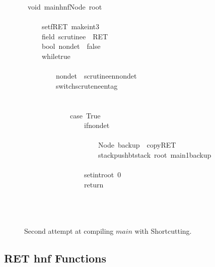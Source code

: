 \documentclass{book}
\theoremstyle{definition}
\newcommand{\Varid}[1]{\mathit{#1}}
\begin{document}
\begin{figure}
\begin{tabbing}\ttfamily
~void~mainhnfNode~root\\
\ttfamily ~\\
\ttfamily ~~~~~setfRET~makeint3\\
\ttfamily ~~~~~field~scrutinee~~RET\\
\ttfamily ~~~~~bool~nondet~~false\\
\ttfamily ~~~~~whiletrue\\
\ttfamily ~~~~~\\
\ttfamily ~~~~~~~~~nondet~~scrutineennondet\\
\ttfamily ~~~~~~~~~switchscruteneentag\\
\ttfamily ~~~~~~~~~\\
\ttfamily ~~~~~~~~~~~~~\\
\ttfamily ~~~~~~~~~~~~~case~True\\
\ttfamily ~~~~~~~~~~~~~~~~~ifnondet\\
\ttfamily ~~~~~~~~~~~~~~~~~\\
\ttfamily ~~~~~~~~~~~~~~~~~~~~~Node~backup~~copyRET\\
\ttfamily ~~~~~~~~~~~~~~~~~~~~~stackpushbtstack~root~main1backup\\
\ttfamily ~~~~~~~~~~~~~~~~~\\
\ttfamily ~~~~~~~~~~~~~~~~~setintroot~0\\
\ttfamily ~~~~~~~~~~~~~~~~~return\\
\ttfamily ~~~~~~~~~~~~~~~~~\\
\ttfamily ~~~~~~~~~\\
\ttfamily ~~~~~
\end{tabbing}
\caption{Second attempt at compiling \ensuremath{\Varid{main}} with Shortcutting.}
\label{fig:RET2}
\end{figure}

\subsection{RET hnf Functions}
\end{document}
